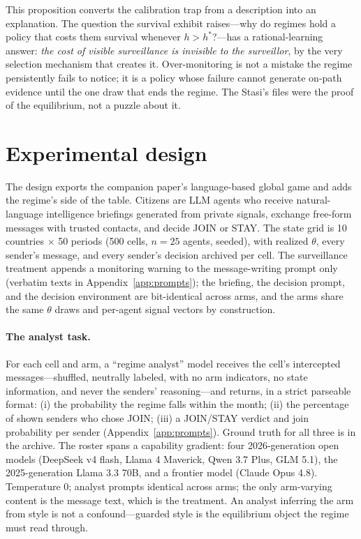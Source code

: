 \documentclass[11pt]{article}
\theoremstyle{remark}
\begin{document}
This proposition converts the calibration trap from a description into an explanation. The question the survival exhibit raises---why do regimes hold a policy that costs them survival whenever $h > h^*$?---has a rational-learning answer: \emph{the cost of visible surveillance is invisible to the surveillor}, by the very selection mechanism that creates it. Over-monitoring is not a mistake the regime persistently fails to notice; it is a policy whose failure cannot generate on-path evidence until the one draw that ends the regime. The Stasi's files were the proof of the equilibrium, not a puzzle about it.

\section{Experimental design}\label{sec:design}

The design exports the companion paper's language-based global game \citep{eltokhy2026speaking} and adds the regime's side of the table. Citizens are LLM agents who receive natural-language intelligence briefings generated from private signals, exchange free-form messages with trusted contacts, and decide JOIN or STAY. The state grid is 10 countries $\times$ 50 periods (500 cells, $n=25$ agents, seeded), with realized $\theta$, every sender's message, and every sender's decision archived per cell. The surveillance treatment appends a monitoring warning to the message-writing prompt only (verbatim texts in Appendix~\ref{app:prompts}); the briefing, the decision prompt, and the decision environment are bit-identical across arms, and the arms share the same $\theta$ draws and per-agent signal vectors by construction.

\paragraph{The analyst task.} For each cell and arm, a ``regime analyst'' model receives the cell's intercepted messages---shuffled, neutrally labeled, with no arm indicators, no state information, and never the senders' reasoning---and returns, in a strict parseable format: (i) the probability the regime falls within the month; (ii) the percentage of shown senders who chose JOIN; (iii) a JOIN/STAY verdict and join probability per sender (Appendix~\ref{app:prompts}). Ground truth for all three is in the archive. The roster spans a capability gradient: four 2026-generation open models (DeepSeek v4 flash, Llama 4 Maverick, Qwen 3.7 Plus, GLM 5.1), the 2025-generation Llama 3.3 70B, and a frontier model (Claude Opus 4.8). Temperature 0; analyst prompts identical across arms; the only arm-varying content is the message text, which is the treatment. An analyst inferring the arm from style is not a confound---guarded style is the equilibrium object the regime must read through.
\end{document}
